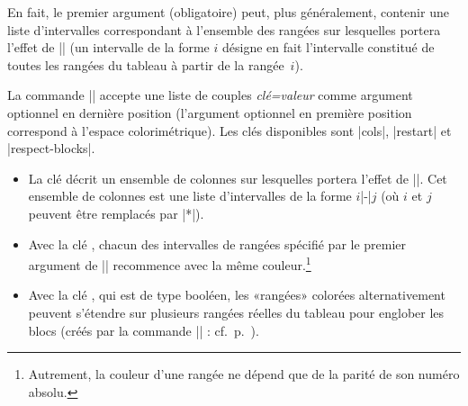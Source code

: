 \documentclass[dvipsnames]{article}%
\begin{document}
\begin{itemize}
En fait, le premier argument (obligatoire) peut, plus généralement, contenir
une liste d'intervalles correspondant à l'ensemble des rangées sur lesquelles
portera l'effet de |\rowcolors| (un intervalle de la forme $i$ désigne en fait
l'intervalle constitué de toutes les rangées du tableau à partir de la rangée~$i$).


\medskip
La commande |\rowcolors| accepte une liste de couples
\textsl{clé=valeur} comme argument optionnel en dernière position (l'argument
optionnel en première position correspond à l'espace colorimétrique). Les clés
disponibles sont |cols|, |restart| et |respect-blocks|.
\begin{itemize}
\item La clé  décrit un ensemble de colonnes sur lesquelles
portera l'effet de |\rowcolors|. Cet ensemble de colonnes est une liste
d'intervalles de la forme $i$|-|$j$ (où $i$ et $j$ peuvent être remplacés par
|*|).

\item Avec la clé , chacun des intervalles de rangées
spécifié par le premier argument de |\rowcolors| recommence avec la même
couleur.\footnote{Autrement, la couleur d'une rangée ne dépend que de la parité
  de son numéro absolu.}

\item Avec la clé , qui est de type booléen, les
«rangées» colorées alternativement peuvent s'étendre sur plusieurs rangées
réelles du tableau pour englober les blocs (créés par la commande |\Block| :
cf.~p.~\pageref{Block}).
\end{itemize}


\end{itemize}
\end{document}
